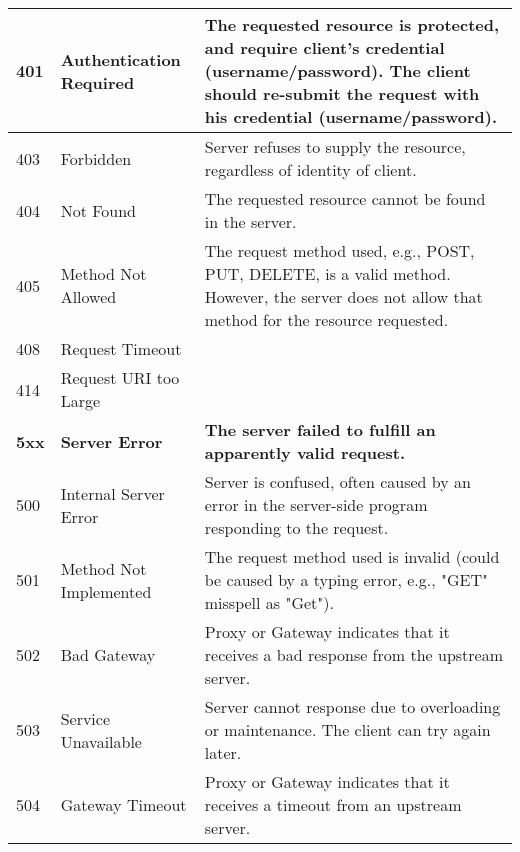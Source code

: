 \documentclass[../main.tex]{subfiles}
\begin{document}
\begin{table}[H]
\begin{center}
\begin{tabular}{|p{3cm}|p{4cm}|p{8cm}|}
                \hline
                401 & Authentication Required & The requested resource is protected, and require client’s credential (username/password). The client should re-submit the request with his credential (username/password).\\
                \hline
                403 & Forbidden & Server refuses to supply the resource, regardless of identity of client.\\
                \hline
                404 & Not Found & The requested resource cannot be found in the server.\\
                \hline
                405 & Method Not Allowed& The request method used, e.g., POST, PUT, DELETE, is a valid method. However, the server does not allow that method for the resource requested.\\
                \hline
                408 & Request Timeout &\\
                \hline
                414 & Request URI too Large &\\
                \hline
                \hline
                \textbf{5xx} &
                \textbf{Server Error} &
                \textbf{The server failed to fulfill an apparently valid request.} \\
                \hline
                500 & Internal Server Error & Server is confused, often caused by an error in the server-side program responding to the request.\\
                \hline
                501 & Method Not Implemented & The request method used is invalid (could be caused by a typing error, e.g., "GET" misspell as "Get").\\
                \hline
                502 & Bad Gateway & Proxy or Gateway indicates that it receives a bad response from the upstream server.\\
                \hline
                503 & Service Unavailable & Server cannot response due to overloading or maintenance. The client can try again later.\\
                \hline
                504 & Gateway Timeout & Proxy or Gateway indicates that it receives a timeout from an upstream server.\\
                \hline
            \end{tabular}
        \end{center}
    \end{table}
\end{document}
